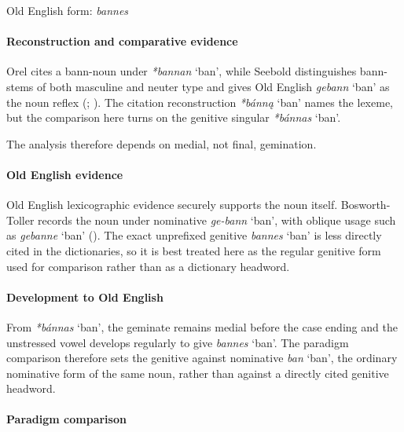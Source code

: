 \documentclass[
  british,
  a4paper,
]{article}
\providecommand{\Recon}[1]{\emph{*#1}}
\begin{document}
Old English form: \emph{bannes}

\paragraph{Reconstruction and comparative
evidence}\label{reconstruction-and-comparative-evidence-124}

Orel cites a bann-noun under \Recon{bannan} `ban', while Seebold
distinguishes bann-stems of both masculine and neuter type and gives Old
English {\emph{gebann}} `ban' as the noun reflex
(;
). The citation
reconstruction \Recon{bánną} `ban' names the lexeme, but the comparison
here turns on the genitive singular \Recon{bánnas} `ban'.

The analysis therefore depends on medial, not final, gemination.

\paragraph{Old English evidence}\label{old-english-evidence-126}

Old English lexicographic evidence securely supports the noun itself.
Bosworth-Toller records the noun under nominative {\emph{ge-bann}}
`ban', with oblique usage such as {\emph{gebanne}} `ban'
(). The
exact unprefixed genitive {\emph{bannes}} `ban' is less directly cited
in the dictionaries, so it is best treated here as the regular genitive
form used for comparison rather than as a dictionary headword.

\paragraph{Development to Old
English}\label{development-to-old-english-124}

From \Recon{bánnas} `ban', the geminate remains medial before the case
ending and the unstressed vowel develops regularly to give
{\emph{bannes}} `ban'. The paradigm comparison therefore sets the
genitive against nominative {\emph{ban}} `ban', the ordinary nominative
form of the same noun, rather than against a directly cited genitive
headword.

\paragraph{Paradigm comparison}\label{paradigm-comparison-1}
\end{document}
